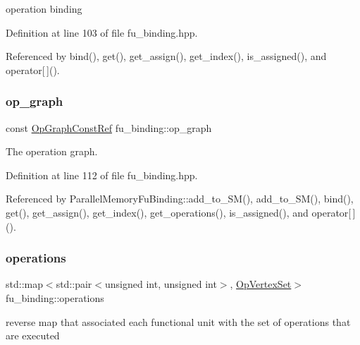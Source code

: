 operation binding 



Definition at line 103 of file fu\+\_\+binding.\+hpp.



Referenced by bind(), get(), get\+\_\+assign(), get\+\_\+index(), is\+\_\+assigned(), and operator\mbox{[}$\,$\mbox{]}().

\mbox{\label{classfu__binding_a8759f9722b6fc616b5746be4de120806}} 
\subsubsection{\texorpdfstring{op\+\_\+graph}{op\_graph}}
{\footnotesize\ttfamily const \hyperlink{op__graph_8hpp_a9a0b240622c47584bee6951a6f5de746}{Op\+Graph\+Const\+Ref} fu\+\_\+binding\+::op\+\_\+graph\hspace{0.3cm}{\ttfamily [protected]}}



The operation graph. 



Definition at line 112 of file fu\+\_\+binding.\+hpp.



Referenced by Parallel\+Memory\+Fu\+Binding\+::add\+\_\+to\+\_\+\+S\+M(), add\+\_\+to\+\_\+\+S\+M(), bind(), get(), get\+\_\+assign(), get\+\_\+index(), get\+\_\+operations(), is\+\_\+assigned(), and operator\mbox{[}$\,$\mbox{]}().

\mbox{\label{classfu__binding_a7317a9846ee0032ec80d2c46b015e29f}} 
\subsubsection{\texorpdfstring{operations}{operations}}
{\footnotesize\ttfamily std\+::map$<$std\+::pair$<$unsigned int, unsigned int$>$, \hyperlink{classOpVertexSet}{Op\+Vertex\+Set}$>$ fu\+\_\+binding\+::operations\hspace{0.3cm}{\ttfamily [protected]}}



reverse map that associated each functional unit with the set of operations that are executed 



